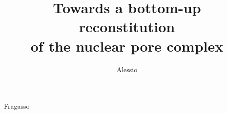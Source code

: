 \documentclass{dissertation}
\begin{document}
\title[]{Towards a bottom-up reconstitution  \\[8pt]of the nuclear pore complex}
\author{Alessio}{Fragasso}

\frontmatter



%
\tableofcontents

%

\mainmatter

\thumbtrue
%

%
%
%
%
%
%
%

%

%

%
%

\thumbfalse

%
%

 
\end{document}
